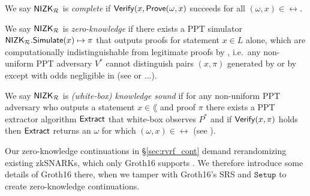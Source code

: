 \begin{definition}\label{def:nizk_completeness}
We say ${\mathsf{NIZK}}_\mathcal{R}$ is {\em complete} if ${\mathsf{Verify}}(x, {\mathsf{Prove}}(\omega,x)$ succeeds for all $(\omega,x) \in \rel$.  %
\end{definition}

\def\advV{\ensuremath{V^*}\xspace} %

\begin{definition}\label{def:nizk_zero_knowledge}
We say ${\mathsf{NIZK}}_\mathcal{R}$ is {\em zero-knowledge} if
there exists a PPT simulator ${\mathsf{NIZK}}_\mathcal{R}.{\mathsf{Simulate}}(x) \mapsto \pi$
that outputs proofs for statement $x \in L$ alone, which are
computationally indistinguishable from legitimate proofs by \Prove,
i.e.\ any non-uniform PPT adversary \advV cannot distinguish pairs $(x,\pi)$
generated by \Simulate or by \Prove except with odds negligible in \secparam
(see \cite[Def. 9, \S A, pap. 29]{RandomizationGroth16} or ...).
\end{definition}

\def\advP{\ensuremath{P^*}\xspace} %

\begin{definition}\label{def:nizk_knowledge_sound}
We say ${\mathsf{NIZK}}_\mathcal{R}$ is {\em (white-box) knowledge sound} if
for any non-uniform PPT adversary \adv who outputs a statement $x \in \lang$ and proof $\pi$
there exists a PPT extractor algorithm ${\mathsf{Extract}}$ that white-box observes $\advP$ and
if ${\mathsf{Verify}}(x,\pi)$ holds then ${\mathsf{Extract}}$ returns an $\omega$ for which $(\omega,x) \in \rel$
(see \cite[Def. 7, \S A, pap. 29]{RandomizationGroth16}).
\end{definition}

Our zero-knowledge continuations in \S\ref{sec:rvrf_cont} demand
rerandomizing existing zkSNARKs, which only Groth16 supports \cite{Groth16}.
We therefore introduce some details of Groth16 \cite{Groth16} there,
when we tamper with Groth16's SRS and $\mathtt{Setup}$ to create zero-knowledge continuations. 

%

